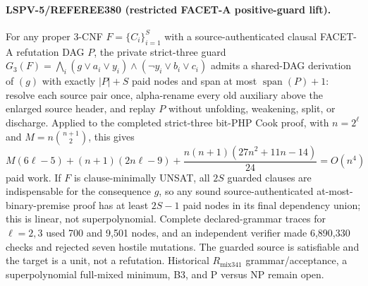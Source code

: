 \paragraph{LSPV-5/REFEREE380 (restricted FACET-A positive-guard lift).}
For any proper 3-CNF $F=\{C_i\}_{i=1}^{S}$ with a source-authenticated clausal FACET-A refutation DAG $P$, the private strict-three guard
$G_3(F)=\bigwedge_i(g\vee a_i\vee y_i)\wedge(\neg y_i\vee b_i\vee c_i)$
admits a shared-DAG derivation of $(g)$ with exactly $|P|+S$ paid nodes and span at most $\operatorname{span}(P)+1$: resolve each source pair once, alpha-rename every old auxiliary above the enlarged source header, and replay $P$ without unfolding, weakening, split, or discharge.  Applied to the completed strict-three bit-PHP Cook proof, with $n=2^\ell$ and $M=n\binom{n+1}{2}$, this gives
\[
 M(6\ell-5)+(n+1)(2n\ell-9)
 +\frac{n(n+1)(27n^2+11n-14)}{24}=O(n^4)
\]
paid work.  If $F$ is clause-minimally UNSAT, all $2S$ guarded clauses are indispensable for the consequence $g$, so any sound source-authenticated at-most-binary-premise proof has at least $2S-1$ paid nodes in its final dependency union; this is linear, not superpolynomial.  Complete declared-grammar traces for $\ell=2,3$ used 700 and 9,501 nodes, and an independent verifier made 6,890,330 checks and rejected seven hostile mutations.  The guarded source is satisfiable and the target is a unit, not a refutation.  Historical $R_{\mathrm{mix341}}$ grammar/acceptance, a superpolynomial full-mixed minimum, B3, and P versus NP remain open.
